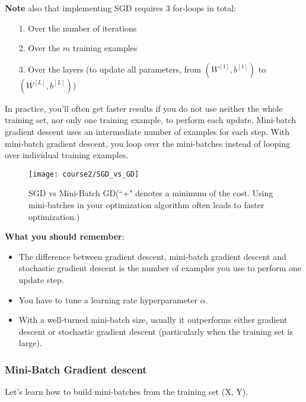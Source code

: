 {{\textbf {Note}} also that implementing SGD requires 3 for-loops in total:
\begin{itemize}
\item[1.] Over the number of iterations
\item[2.] Over the $m$ training examples
\item[3.] Over the layers (to update all parameters, from $(W^{[1]},b^{[1]})$ to $(W^{[L]},b^{[L]})$)
\end{itemize}

In practice, you'll often get faster results if you do not use neither the whole training set, nor only one training example, to perform each update. Mini-batch gradient descent uses an intermediate number of examples for each step. With mini-batch gradient descent, you loop over the mini-batches instead of looping over individual training examples.
\clearpage
\begin{figure}[h]
\begin{center}
\texttt{[image: course2/SGD\_vs\_GD]}
\end{center}
\caption{ SGD vs Mini-Batch GD(``+" denotes a minimum of the cost. Using mini-batches in your optimization algorithm often leads to faster optimization.)}
\label{fig: SGD_vs_Mini-Batch_GD}
\end{figure}



{\color{red} {\textbf {What you should remember}}:
\begin{itemize}
\item The difference between gradient descent, mini-batch gradient descent and stochastic gradient descent is the number of examples you use to perform one update step.
\item You have to tune a learning rate hyperparameter $\alpha$.
\item With a well-turned mini-batch size, usually it outperforms either gradient descent or stochastic gradient descent (particularly when the training set is large).
\end{itemize}
}



\subsubsection{Mini-Batch Gradient descent}

Let's learn how to build mini-batches from the training set (X, Y).

}
